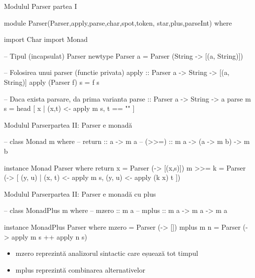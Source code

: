 \documentclass[xcolor=pdftex,romanian,colorlinks]{beamer}
\begin{document}
\begin{frame}[fragile]{Modulul Parser}
{partea I}
\begin{asciihs}
  module Parser(Parser,apply,parse,char,spot,token,
    star,plus,parseInt) where

  import Char
  import Monad

  -- Tipul (incapsulat) Parser
  newtype Parser a = Parser (String -> [(a, String)])

  -- Folosirea unui parser (functie privata)
  apply :: Parser a -> String -> [(a, String)]
  apply (Parser f) s = f s

  -- Daca exista parsare, da prima varianta
  parse :: Parser a -> String -> a
  parse m s = head [ x | (x,t) <- apply m s, t == "" ]
\end{asciihs}
\end{frame}



\begin{frame}[fragile]{Modulul Parser}{partea II: Parser e monadă}
\begin{asciihs}

  --   class Monad m where
  --     return :: a -> m a
  --     (>>=) :: m a -> (a -> m b) -> m b

  instance Monad Parser where
    return x  = Parser (\s -> [(x,s)])
    m >>= k   = Parser (\s ->
                   [ (y, u) |
                     (x, t) <- apply m s,
                     (y, u) <- apply (k x) t ])
\end{asciihs}
\end{frame}



\begin{frame}[fragile]{Modulul Parser}{partea II: Parser e monadă cu plus}
\begin{asciihs}
  --   class MonadPlus m where
  --     mzero :: m a
  --     mplus :: m a -> m a -> m a

  instance MonadPlus Parser where
    mzero      = Parser (\s -> [])
    mplus m n  = Parser (\s -> apply m s ++ apply n s)
\end{asciihs}

\begin{itemize}
\item mzero reprezintă analizorul sintactic care eșuează tot timpul
\item mplus reprezintă combinarea alternativelor
\end{itemize}

\end{frame}
\end{document}
